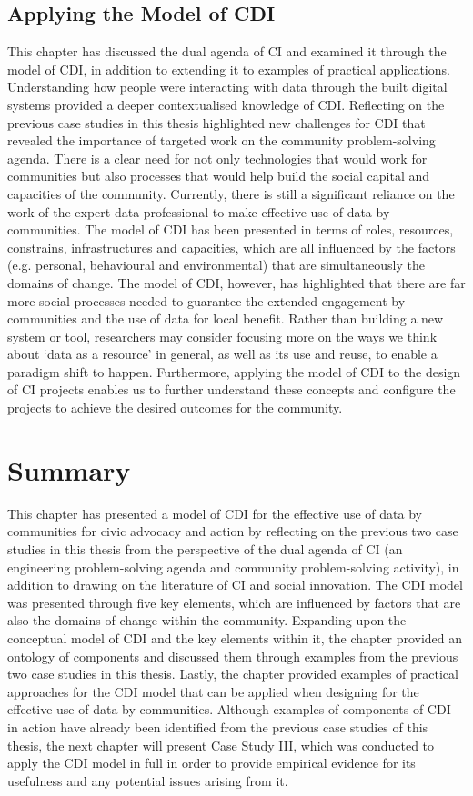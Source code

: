 \subsection{Applying the Model of CDI}
This chapter has discussed the dual agenda of CI and examined it through the model of CDI, in addition to extending it to examples of practical applications. Understanding how people were interacting with data through the built digital systems provided a deeper contextualised knowledge of CDI. Reflecting on the previous case studies in this thesis highlighted new challenges for CDI that revealed the importance of targeted work on the community problem-solving agenda. There is a clear need for not only technologies that would work for communities but also processes that would help build the social capital and capacities of the community. Currently, there is still a significant reliance on the work of the expert data professional to make effective use of data by communities. The model of CDI has been presented in terms of roles, resources, constrains, infrastructures and capacities, which are all influenced by the factors (e.g. personal, behavioural and environmental) that are simultaneously the domains of change. The model of CDI, however, has highlighted that there are far more social processes needed to guarantee the extended engagement by communities and the use of data for local benefit. Rather than building a new system or tool, researchers may consider focusing more on the ways we think about `data as a resource' in general, as well as its use and reuse, to enable a paradigm shift to happen. Furthermore, applying the model of CDI to the design of CI projects enables us to further understand these concepts and configure the projects to achieve the desired outcomes for the community.
\clearpage

\section{Summary}
This chapter has presented a model of CDI for the effective use of data by communities for civic advocacy and action by reflecting on the previous two case studies in this thesis from the perspective of the dual agenda of CI (an engineering problem-solving agenda and community problem-solving activity), in addition to drawing on the literature of CI and social innovation. The CDI model was presented through five key elements, which are influenced by factors that are also the domains of change within the community. Expanding upon the conceptual model of CDI and the key elements within it, the chapter provided an ontology of components and discussed them through examples from the previous two case studies in this thesis. Lastly, the chapter provided examples of practical approaches for the CDI model that can be applied when designing for the effective use of data by communities. Although examples of components of CDI in action have already been identified from the previous case studies of this thesis, the next chapter will present Case Study III, which was conducted to apply the CDI model in full in order to provide empirical evidence for its usefulness and any potential issues arising from it.